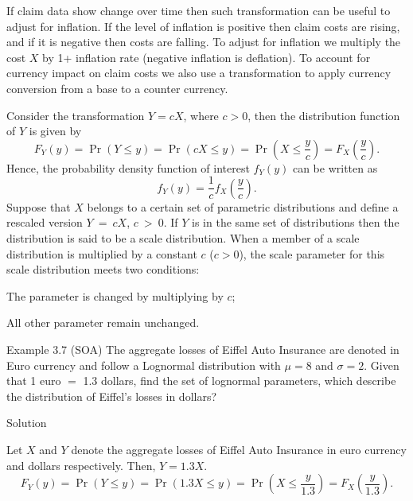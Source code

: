 \documentclass[]{book}
\begin{document}
If claim data show change over time then such transformation can be
useful to adjust for inflation. If the level of inflation is positive
then claim costs are rising, and if it is negative then costs are
falling. To adjust for inflation we multiply the cost \(X\) by 1+
inflation rate (negative inflation is deflation). To account for
currency impact on claim costs we also use a transformation to apply
currency conversion from a base to a counter currency.

Consider the transformation \(Y = cX\), where \(c > 0\), then the
distribution function of \(Y\) is given by
\[F_{Y}\left( y \right) = \Pr\left( Y \leq y \right) = \Pr\left( cX \leq y \right) = \Pr\left( X \leq \frac{y}{c} \right) = F_{X}\left( \frac{y}{c} \right).\]
Hence, the probability density function of interest \(f_{Y}(y)\) can be
written as
\[f_{Y}\left( y \right) = \frac{1}{c}f_{X}\left( \frac{y}{c} \right).\]
Suppose that \(X\) belongs to a certain set of parametric distributions
and define a rescaled version \(Y\  = \ cX\), \(c\  > \ 0\). If \(Y\) is
in the same set of distributions then the distribution is said to be a
scale distribution. When a member of a scale distribution is multiplied
by a constant \(c\) (\(c > 0\)), the scale parameter for this scale
distribution meets two conditions:

The parameter is changed by multiplying by \(c\);

All other parameter remain unchanged.

Example 3.7 (SOA) The aggregate losses of Eiffel Auto Insurance are
denoted in Euro currency and follow a Lognormal distribution with
\(\mu = 8\) and \(\sigma = 2\). Given that 1 euro \(=\) 1.3 dollars,
find the set of lognormal parameters, which describe the distribution of
Eiffel's losses in dollars?

Solution

Let \(X\) and \(Y\) denote the aggregate losses of Eiffel Auto Insurance
in euro currency and dollars respectively. Then, \(Y = 1.3X\).
\[F_{Y}\left( y \right) = \Pr\left( Y \leq y \right) = \Pr\left( 1.3X \leq y \right) = \Pr\left( X \leq \frac{y}{1.3} \right) = F_{X}\left( \frac{y}{1.3} \right).\]
\end{document}
